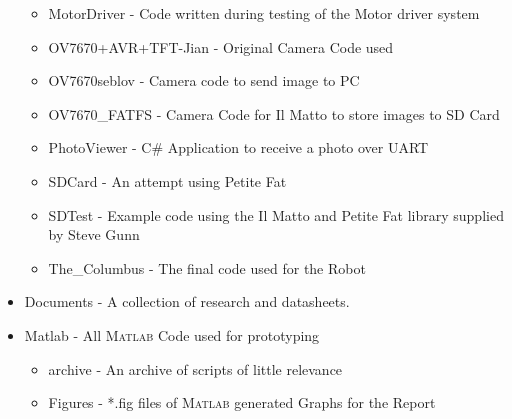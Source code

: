 \begin{itemize}
\begin{itemize}
\item MotorDriver - Code written during testing of the Motor driver system
\item OV7670+AVR+TFT-Jian - Original Camera Code used
\item OV7670seblov - Camera code to send image to PC
\item OV7670\_FATFS - Camera Code for Il Matto to store images to SD Card
\item PhotoViewer - C\# Application to receive a photo over UART
\item SDCard - An attempt using Petite Fat
\item SDTest - Example code using the Il Matto and Petite Fat library supplied by Steve Gunn
\item The\_Columbus - The final code used for the Robot
\end{itemize}
\item Documents - A collection of research and datasheets. 
\item Matlab - All \textsc{Matlab} Code used for prototyping
\begin{itemize}
\item archive - An archive of scripts of little relevance
\item Figures - *.fig files of \textsc{Matlab} generated Graphs for the Report

\end{itemize}
\end{itemize}
